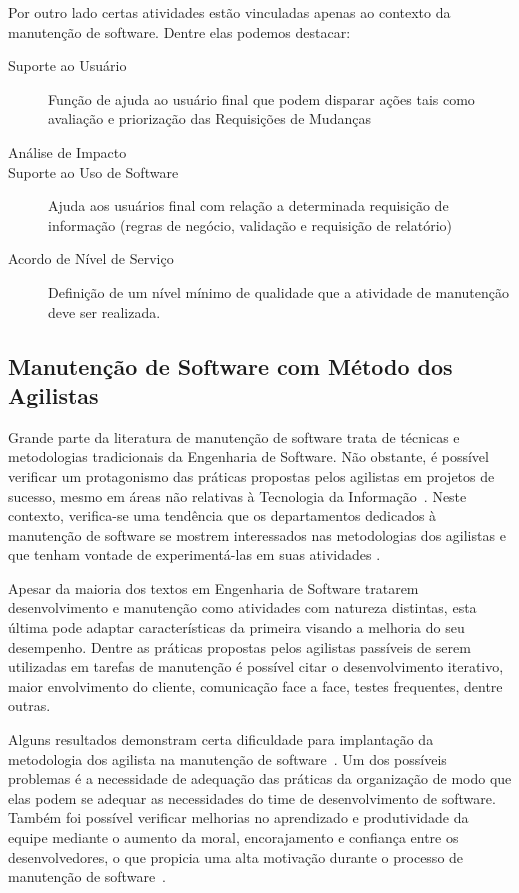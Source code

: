 Por outro lado certas atividades estão vinculadas apenas ao contexto da manutenção de software. Dentre elas podemos destacar:

\begin{description}
	\item[Suporte ao Usuário] Função de ajuda ao usuário final que podem disparar ações tais como avaliação e
		priorização das Requisições de Mudanças
	\item [Análise de Impacto] 
	\item [Suporte ao Uso de Software] Ajuda aos usuários final com relação a determinada requisição
		de informação (regras de negócio, validação e requisição de relatório)
	\item [Acordo de Nível de Serviço] Definição de um nível mínimo de qualidade que a atividade de
		manutenção deve ser realizada.	
\end{description}

\subsection{Manutenção de Software com Método dos Agilistas}
\label{sub:manutenção_de_software_com_método_dos_agilistas}

Grande parte da literatura de manutenção de software trata de técnicas e metodologias tradicionais
da Engenharia de Software. Não obstante, é possível verificar um protagonismo das práticas propostas
pelos agilistas em projetos de sucesso, mesmo em áreas não relativas à Tecnologia da Informação~\cite{Serrador2015}. Neste contexto, verifica-se uma tendência que os departamentos dedicados à
manutenção de software se mostrem interessados nas metodologias dos agilistas e que tenham vontade
de experimentá-las em suas atividades \cite{Heeager2015}.

Apesar da maioria dos textos em Engenharia de Software tratarem desenvolvimento e manutenção como
atividades com natureza distintas, esta última pode adaptar características da primeira visando a
melhoria do seu desempenho. Dentre as práticas propostas pelos agilistas passíveis de serem
utilizadas em tarefas de manutenção é possível citar o desenvolvimento iterativo, maior envolvimento
do cliente, comunicação face a face, testes frequentes, dentre outras.

Alguns resultados demonstram certa dificuldade para implantação da metodologia dos agilista na
manutenção de software~\cite{1402140}. Um dos possíveis problemas é a necessidade de adequação das
práticas da organização de modo que elas podem se adequar as necessidades do time de desenvolvimento
de software. Também foi possível verificar melhorias no aprendizado e produtividade da equipe
mediante o aumento da moral, encorajamento e confiança entre os desenvolvedores, o que propicia uma
alta motivação durante o processo de manutenção de software~\cite{Choudhari:2014:EIM:2557833.2557845}.


